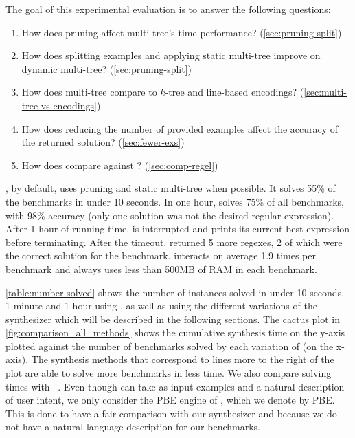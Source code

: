 \medskip\noindent
The goal of this experimental evaluation is to answer the following questions:
\begin{enumerate}[label=\textbf{Q\arabic*}.]
\item How does pruning affect multi-tree's time performance? (\autoref{sec:pruning-split})
%
\item How does splitting examples and applying static multi-tree improve on dynamic multi-tree? (\autoref{sec:pruning-split})
%
\item How does multi-tree compare to \(k\)-tree and line-based encodings? (\autoref{sec:multi-tree-vs-encodings})
%
\item How does reducing the number of provided examples affect the accuracy of the returned solution? (\autoref{sec:fewer-exs})
%
\item How does \Forest{} compare against \Regel? (\autoref{sec:comp-regel})
\end{enumerate}




%

\Forest{}, by default, uses pruning and static multi-tree when possible. It solves 55\% of the benchmarks in under 10 seconds. In one hour, \Forest{} solves 75\% of all benchmarks, with 98\% accuracy (only one solution was not the desired regular expression). After 1 hour of running time, \Forest{} is interrupted and prints its current best expression before terminating. After the timeout, \Forest{} returned 5 more regexes, 2 of which were the correct solution for the benchmark.
\Forest{} interacts on average 1.9 times per benchmark and always uses less than 500MB of RAM in each benchmark.

\autoref{table:number-solved} shows the number of instances solved in under 10 seconds, 1 minute and 1 hour using \Forest{}, as well as using the different variations of the synthesizer which will be described in the following sections. The cactus plot in \autoref{fig:comparison_all_methods} shows the cumulative synthesis time on the y-axis plotted against the number of benchmarks solved by each variation of \Forest{} (on the x-axis). The synthesis methods that correspond to lines more to the right of the plot are able to solve more benchmarks in less time. 
%
We also compare solving times with \Regel~\cite{Regel20}. Even though \Regel can take as input examples and a natural description of user intent, we only consider the PBE engine of \Regel, which we denote by \Regel PBE. This is done to have a fair comparison with our synthesizer and because we do not have a natural language description for our benchmarks.%

